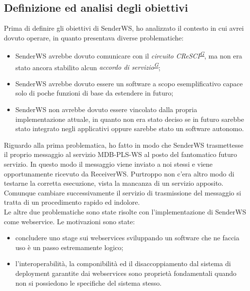 \documentclass[a4paper]{article}
\begin{document}
\subsection{Definizione ed analisi degli obiettivi}
Prima di definire gli obiettivi di SenderWS, ho analizzato il contesto in cui avrei dovuto operare, in quanto presentava diverse problematiche:
\begin{itemize}
	\item SenderWS avrebbe dovuto comunicare con il \textit{circuito CReSCI\textsuperscript{\hyperref[sec:gl]{G}}}, ma non era stato ancora stabilito alcun \textit{accordo di servizio\textsuperscript{\hyperref[sec:gl]{G}}};
    \item SenderWS avrebbe dovuto essere un software a scopo esemplificativo capace solo di poche funzioni di base da estendere in futuro;
    \item SenderWS non avrebbe dovuto essere vincolato dalla propria implementazione attuale, in quanto non era stato deciso se in futuro sarebbe stato integrato negli applicativi oppure sarebbe stato un software autonomo.
\end{itemize}
Riguardo alla prima problematica, ho fatto in modo che SenderWS trasmettesse il proprio messaggio al servizio MDB-PLS-WS al posto del fantomatico futuro servizio. In questo modo il messaggio viene inviato a noi stessi e viene opportunamente ricevuto da ReceiverWS. Purtroppo non c'era altro modo di testarne la corretta esecuzione, vista la mancanza di un servizio apposito. Comunque cambiare successivamente il servizio di trasmissione del messaggio si tratta di un procedimento rapido ed indolore.
\\
Le altre due problematiche sono state risolte con l'implementazione di SenderWS come webservice. Le motivazioni sono state:
\begin{itemize}
	\item concludere uno stage sui webservices sviluppando un software che ne faccia uso è un passo estremamente logico;
    \item l'interoperabilità, la componibilità ed il disaccoppiamento dal sistema di deployment garantite dai webservices sono proprietà fondamentali quando non si possiedono le specifiche del sistema stesso.
\end{itemize}
\end{document}
